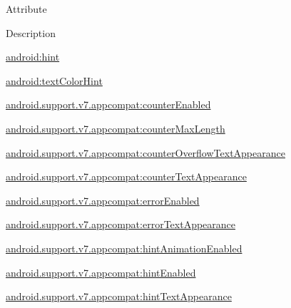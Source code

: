 Attribute

Description 

{\ttfamily \hyperlink{classandroid_1_1support_1_1v7_1_1appcompat_1_1R_1_1styleable_abb324015c1082661e99107047389570c}{android\+:hint}}

{\ttfamily \hyperlink{classandroid_1_1support_1_1v7_1_1appcompat_1_1R_1_1styleable_aee5a3e884d476f02f2abe67a3dfa0593}{android\+:text\+Color\+Hint}}

{\ttfamily \hyperlink{classandroid_1_1support_1_1v7_1_1appcompat_1_1R_1_1styleable_ac54647cf8e894dfd152943e336c01486}{android.\+support.\+v7.\+appcompat\+:counter\+Enabled}}

{\ttfamily \hyperlink{classandroid_1_1support_1_1v7_1_1appcompat_1_1R_1_1styleable_a793c82374695417c1f4d0a1417cbcacc}{android.\+support.\+v7.\+appcompat\+:counter\+Max\+Length}}

{\ttfamily \hyperlink{classandroid_1_1support_1_1v7_1_1appcompat_1_1R_1_1styleable_af52e4bb48c3468ccf7ac636439c45789}{android.\+support.\+v7.\+appcompat\+:counter\+Overflow\+Text\+Appearance}}

{\ttfamily \hyperlink{classandroid_1_1support_1_1v7_1_1appcompat_1_1R_1_1styleable_afb345d2fd2db6ca23ec4772a9051c0e5}{android.\+support.\+v7.\+appcompat\+:counter\+Text\+Appearance}}

{\ttfamily \hyperlink{classandroid_1_1support_1_1v7_1_1appcompat_1_1R_1_1styleable_abce6bca775196b0f23b9f0f81ac9bd70}{android.\+support.\+v7.\+appcompat\+:error\+Enabled}}

{\ttfamily \hyperlink{classandroid_1_1support_1_1v7_1_1appcompat_1_1R_1_1styleable_a061ba991b6d0e7f4f5d12421d1455f6d}{android.\+support.\+v7.\+appcompat\+:error\+Text\+Appearance}}

{\ttfamily \hyperlink{classandroid_1_1support_1_1v7_1_1appcompat_1_1R_1_1styleable_a251daf99133a0fb31843185d95f33d0d}{android.\+support.\+v7.\+appcompat\+:hint\+Animation\+Enabled}}

{\ttfamily \hyperlink{classandroid_1_1support_1_1v7_1_1appcompat_1_1R_1_1styleable_a20426c1cbc9060134282fe9a4c3a60dc}{android.\+support.\+v7.\+appcompat\+:hint\+Enabled}}

{\ttfamily \hyperlink{classandroid_1_1support_1_1v7_1_1appcompat_1_1R_1_1styleable_a49690b12689de9f06e6a52752ca6f259}{android.\+support.\+v7.\+appcompat\+:hint\+Text\+Appearance}}

